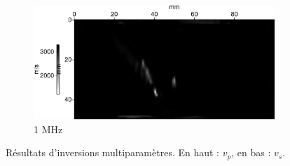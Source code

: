 \documentclass[a4paper,11pt]{report} %
\newenvironment{changemargin}[2]{\begin{list}{}{%
\setlength{\topsep}{0pt}%
\setlength{\leftmargin}{0pt}%
\setlength{\rightmargin}{0pt}%
\setlength{\listparindent}{\parindent}%
\setlength{\itemindent}{\parindent}%
\setlength{\parsep}{0pt plus 1pt}%
\addtolength{\leftmargin}{#1}%
\addtolength{\rightmargin}{#2}%
\setlength{\textwidth}{21cm}
}\item }{\end{list}}
\begin{document}
\begin{figure}[!h]
\begin{changemargin}{-2cm}{-2cm}
\begin{subfigure}[b]{0.23\textwidth}
			\includegraphics[width=\textwidth]{img/multi_trans/vs_multi_1M.png}
			\caption{1 MHz}
		\end{subfigure}
	\end{changemargin}
	\caption{Résultats d'inversions multiparamètres. En haut : $v_{p}$, en bas : $v_{s}$.\label{res:multi_trans}}
\end{figure}
\end{document}
